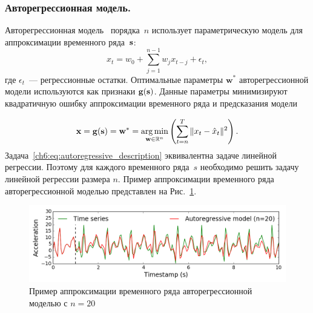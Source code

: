 \subsubsection{Авторегрессионная модель.}
Авторегрессионная модель~\cite{lukashin2003adaptive} порядка~$n$
использует параметрическую модель для аппроксимации временного ряда~$\mathbf{s}$:
\begin{equation*}
	x_t = w_0 + \sum_{j=1}^{n-1} w_j x_{t-j} + \epsilon_t,
\end{equation*}
где $\epsilon_t$~--- регрессионные остатки.
Оптимальные параметры $\mathbf{w}^*$ авторегрессионной модели используются как признаки $\mathbf{g}(\mathbf{s})$.
Данные параметры минимизируют квадратичную ошибку аппроксимации временного ряда и предсказания модели

\begin{equation}
	\mathbf{x} = \mathbf{g}(\mathbf{s}) = \mathbf{w}^* = \mathop{\arg \min}\limits_{\mathbf{w} \in \mathbb{R}^{n}} \left( \sum_{t=n}^{T} \|x_t - \hat{x}_t\|^2\right).
	\label{ch6:eq:autoregressive_description}
\end{equation}
Задача~\eqref{ch6:eq:autoregressive_description} эквивалентна задаче линейной регрессии.
Поэтому для каждого временного ряда~$s$ необходимо решить задачу линейной регрессии размера $n$.
Пример аппроксимации временного ряда авторегрессионной моделью представлен на Рис.~\ref{ch6:fig:ar_example}.

\begin{figure}[ht]
	\centering
	\includegraphics[width=1\linewidth]{figs/ch6/ar_example.png}
	\caption{Пример аппроксимации временного ряда авторегрессионной моделью с $n = 20$}
	\label{ch6:fig:ar_example}
\end{figure}

